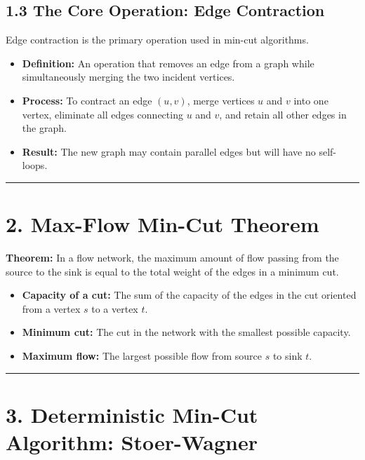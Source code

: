 \documentclass[12pt]{article}
\begin{document}
\subsection*{1.3 The Core Operation: Edge Contraction}

Edge contraction is the primary operation used in min-cut algorithms.

\begin{itemize}
\item \textbf{Definition:} An operation that removes an edge from a graph while simultaneously merging the two incident vertices.

\item \textbf{Process:} To contract an edge $(u,v)$, merge vertices $u$ and $v$ into one vertex, eliminate all edges connecting $u$ and $v$, and retain all other edges in the graph.

\item \textbf{Result:} The new graph may contain parallel edges but will have no self-loops.
\end{itemize}

\hrule
\vspace{0.5em}

\section*{2. Max-Flow Min-Cut Theorem}

\textbf{Theorem:} In a flow network, the maximum amount of flow passing from the source to the sink is equal to the total weight of the edges in a minimum cut.

\begin{itemize}
\item \textbf{Capacity of a cut:} The sum of the capacity of the edges in the cut oriented from a vertex $s$ to a vertex $t$.

\item \textbf{Minimum cut:} The cut in the network with the smallest possible capacity.

\item \textbf{Maximum flow:} The largest possible flow from source $s$ to sink $t$.
\end{itemize}

\hrule
\vspace{0.5em}

\section*{3. Deterministic Min-Cut Algorithm: Stoer-Wagner}
\end{document}
